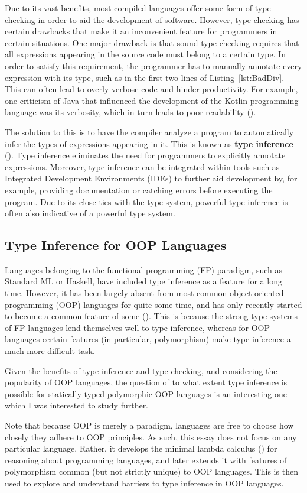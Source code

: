 Due to its vast benefits, most compiled languages offer some form of type checking in order to aid the development of software. However, type checking has certain drawbacks that make it an inconvenient feature for programmers in certain situations. One major drawback is that sound type checking requires that all expressions appearing in the source code must belong to a certain type. In order to satisfy this requirement, the programmer has to manually annotate every expression with its type, such as in the first two lines of Listing~\ref{lst:BadDiv}. This can often lead to overly verbose code and hinder productivity. For example, one criticism of Java that influenced the development of the Kotlin programming language was its verbosity, which in turn leads to poor readability (\cite{breslav}).

The solution to this is to have the compiler analyze a program to automatically infer the types of expressions appearing in it. This is known as \textbf{type inference} (\cite{krishnamurthi2012}). Type inference eliminates the need for programmers to explicitly annotate expressions. Moreover, type inference can be integrated within tools such as Integrated Development Environments (IDEs) to further aid development by, for example, providing documentation or catching errors before executing the program. Due to its close ties with the type system, powerful type inference is often also indicative of a powerful type system.

\subsection{Type Inference for OOP Languages}

Languages belonging to the functional programming (FP) paradigm, such as Standard ML or Haskell, have included type inference as a feature for a long time. However, it has been largely absent from most common object-oriented programming (OOP) languages for quite some time, and has only recently started to become a common feature of some (\cite{leandro}). This is because the strong type systems of FP languages lend themselves well to type inference, whereas for OOP languages certain features (in particular, polymorphism) make type inference a much more difficult task.

Given the benefits of type inference and type checking, and considering the popularity of OOP languages, the question of to what extent type inference is possible for statically typed polymorphic OOP languages is an interesting one which I was interested to study further.

Note that because OOP is merely a paradigm, languages are free to choose how closely they adhere to OOP principles. As such, this essay does not focus on any particular language. Rather, it develops the minimal lambda calculus (\lambdacalc) for reasoning about programming languages, and later extends it with features of polymorphism common (but not strictly unique) to OOP languages. This is then used to explore and understand barriers to type inference in OOP languages.
